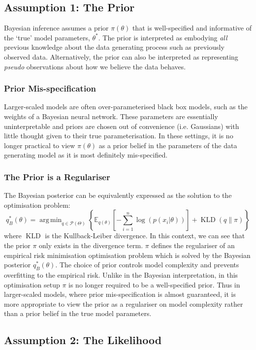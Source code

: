 \documentclass[twoside,11pt]{article}
\newcommand{\KLD}{\operatorname{KLD}}
\DeclareMathOperator*{\argmin}{arg\,min}
\begin{document}
\subsection{Assumption 1: The Prior}
Bayesian inference assumes a prior $\pi(\theta)$ that is well-specified and informative of the `true' model parameters, $\theta^*$. The prior is interpreted as embodying \textit{all} previous knowledge about the data generating process such as previously observed data. Alternatively, the prior can also be interpreted as representing \textit{pseudo} observations about how we believe the data behaves.
\subsubsection{Prior Mis-specification}
Larger-scaled models are often over-parameterised black box models, such as the weights of a Bayesian neural network. These parameters are essentially uninterpretable and priors are chosen out of convenience (i.e. Gaussians) with little thought given to their true parameterisation. In these settings, it is no longer practical to view $\pi(\theta)$ as a prior belief in the parameters of the data generating model as it is most definitely mis-specified.
\subsubsection{The Prior is a Regulariser}
The Bayesian posterior can be equivalently expressed as the solution to the optimisation problem:
\[q_B^*(\theta) = \argmin_{q \in \mathcal{P}(\Theta)} \left\{\mathbb{E}_{q(\theta)}\left[-\sum_{i=1}^n \log\left(p(x_i|\theta)\right)\right] + \KLD(q\|\pi)\right\}\]
where $\KLD$ is the Kullback-Leiber divergence. In this context, we can see that the prior $\pi$ only exists in the divergence term. $\pi$ defines the regulariser of an empirical risk minimisation optimisation problem which is solved by the Bayesian posterior $q_B^*(\theta)$. The choice of prior controls model complexity and prevents overfitting to the empirical risk. Unlike in the Bayesian interpretation, in this optimisation setup $\pi$ is no longer required to be a well-specified prior. Thus in larger-scaled models, where prior mis-specification is almost guaranteed, it is more appropriate to view the prior as a regulariser on model complexity rather than a prior belief in the true model parameters.

\subsection{Assumption 2: The Likelihood}
\end{document}
